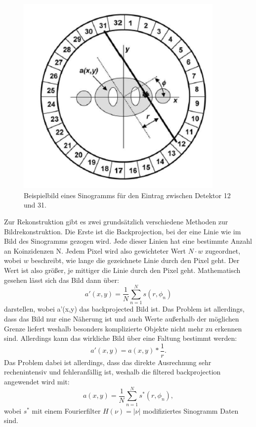 \begin{figure}[h!]
	\centering
	\includegraphics[width=0.9\textwidth]{Sino.png}
	\caption{Beispielbild eines Sinogramms für den Eintrag zwischen Detektor 12 und 31.}
	\label{Sino}
\end{figure}

Zur Rekonstruktion gibt es zwei grundsätzlich verschiedene Methoden zur Bildrekonstruktion. Die Erste ist die Backprojection, bei der eine Linie wie im Bild des Sinogramms gezogen wird. Jede dieser Linien hat eine bestimmte Anzahl an Koinzidenzen N. Jedem Pixel wird also gewichteter Wert $N \cdot w$ zugeordnet, wobei $w$ beschreibt, wie lange die gezeichnete Linie durch den Pixel geht. Der Wert ist also größer, je mittiger die Linie durch den Pixel geht. Mathematisch gesehen lässt sich das Bild dann über:
\begin{equation}
	a'(x,y) = \frac{1}{N} \sum_{n = 1}^{N}s(r,\phi_{n})
\end{equation}
darstellen, wobei a'(x,y) das backprojected Bild ist. Das Problem ist allerdings, dass das Bild nur eine Näherung ist und auch Werte außerhalb der möglichen Grenze liefert weshalb besonders komplizierte Objekte nicht mehr zu erkennen sind. Allerdings kann das wirkliche Bild über eine Faltung bestimmt werden:
\begin{equation}
	a'(x,y) = a(x,y)  * \frac{1}{r}.
\end{equation}
Das Problem dabei ist allerdings, dass das direkte Ausrechnung sehr rechenintensiv und fehleranfällig ist, weshalb die filtered backprojection angewendet wird mit:
\begin{equation}
	a(x,y) = \frac{1}{N} \sum_{n = 1}^{N} s^{*}(r,\phi_{n}),
\end{equation}
wobei $s^{*}$ mit einem Fourierfilter $H(\nu) = |\nu|$ modifiziertes Sinogramm Daten sind.

